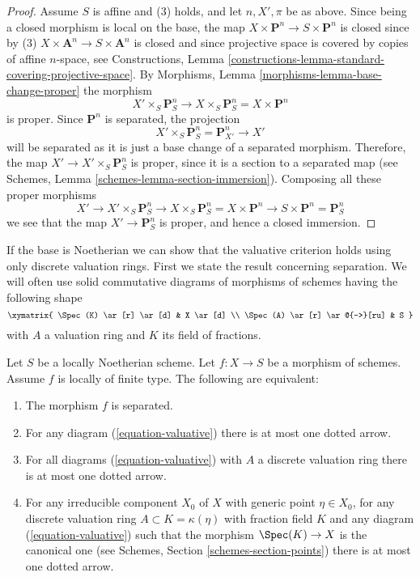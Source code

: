 \begin{proof}
\medskip\noindent
Assume $S$ is affine and (3) holds, and let $n, X', \pi$ be as above.
Since being a closed morphism is local on the base, the map
$X \times \mathbf{P}^n \to S \times \mathbf{P}^n$ is closed since by (3)
$X \times \mathbf{A}^n \to S \times \mathbf{A}^n$ is closed and since
projective space is covered by copies of affine $n$-space, see
Constructions,
Lemma \ref{constructions-lemma-standard-covering-projective-space}.
By Morphisms, Lemma \ref{morphisms-lemma-base-change-proper}
the morphism
$$
X' \times_S \mathbf{P}^n_S
\to
X \times_S \mathbf{P}^n_S =
X \times \mathbf{P}^n
$$
is proper. Since $\mathbf{P}^n$ is separated, the projection
$$
X' \times_S \mathbf{P}^n_S = \mathbf{P}^n_{X'} \to X'
$$
will be separated as it is just a base change of a separated
morphism. Therefore, the map $X' \to X' \times_S \mathbf{P}^n_S$ is proper,
since it is a section to a separated map (see
Schemes, Lemma \ref{schemes-lemma-section-immersion}).
Composing all these proper morphisms
$$
X' \to X' \times_S \mathbf{P}^n_S \to X \times_S \mathbf{P}^n_S
= X \times \mathbf{P}^n \to S \times \mathbf{P}^n = \mathbf{P}^n_S
$$
we see
that the map $X' \to \mathbf{P}^n_S$ is proper, and hence a closed
immersion.
\end{proof}

\noindent
If the base is Noetherian we can show that the valuative criterion holds
using only discrete valuation rings. First we state the result concerning
separation. We will often use solid commutative diagrams of morphisms of
schemes having the following shape
\begin{equation}
\label{equation-valuative}
\xymatrix{
\Spec(K) \ar[r] \ar[d] & X \ar[d] \\
\Spec(A) \ar[r] \ar@{-->}[ru] & S
}
\end{equation}
with $A$ a valuation ring and $K$ its field of fractions.

\begin{lemma}
\label{lemma-Noetherian-dvr-valuative-separation}
Let $S$ be a locally Noetherian scheme.
Let $f : X \to S$ be a morphism of schemes.
Assume $f$ is locally of finite type.
The following are equivalent:
\begin{enumerate}
\item The morphism $f$ is separated.
\item For any diagram (\ref{equation-valuative}) there is at most
one dotted arrow.
\item For all diagrams (\ref{equation-valuative}) with $A$ a discrete
valuation ring there is at most one dotted arrow.
\item For any irreducible component $X_0$ of $X$ with
generic point $\eta \in X_0$, for any discrete valuation ring
$A \subset K = \kappa(\eta)$ with fraction field $K$ and any
diagram (\ref{equation-valuative}) such that
the morphism $\Spec(K) \to X$ is the canonical one
(see Schemes, Section \ref{schemes-section-points})
there is at most one dotted arrow.
\end{enumerate}
\end{lemma}

